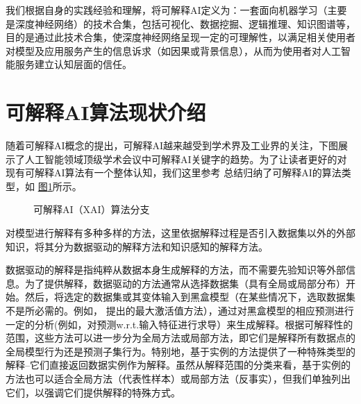 \documentclass[letterpaper,10pt,english]{sphinxmanual}
\let\sphinxpxdimen\pdfpxdimen\else\newdimen\sphinxpxdimen
\begin{document}
\sphinxAtStartPar
我们根据自身的实践经验和理解，将可解释AI定义为：一套面向机器学习（主要是深度神经网络）的技术合集，包括可视化、数据挖掘、逻辑推理、知识图谱等，目的是通过此技术合集，使深度神经网络呈现一定的可理解性，以满足相关使用者对模型及应用服务产生的信息诉求（如因果或背景信息），从而为使用者对人工智能服务建立认知层面的信任。


\section{可解释AI算法现状介绍}
\label{\detokenize{chapter_explainable_AI/explainable_ai:id2}}
\sphinxAtStartPar
随着可解释AI概念的提出，可解释AI越来越受到学术界及工业界的关注，下图展示了人工智能领域顶级学术会议中可解释AI关键字的趋势。为了让读者更好的对现有可解释AI算法有一个整体认知，我们这里参考
总结归纳了可解释AI的算法类型，如
\hyperref[\detokenize{chapter_explainable_AI/explainable_ai:xai-methods}]{图\ref{\detokenize{chapter_explainable_AI/explainable_ai:xai-methods}}}所示。

\begin{figure}[H]
\centering
\capstart

\noindent\sphinxincludegraphics[width=800\sphinxpxdimen]{{XAI_methods}.PNG}
\caption{可解释AI（XAI）算法分支}\label{\detokenize{chapter_explainable_AI/explainable_ai:id24}}\label{\detokenize{chapter_explainable_AI/explainable_ai:xai-methods}}\end{figure}

\sphinxAtStartPar
对模型进行解释有多种多样的方法，这里依据解释过程是否引入数据集以外的外部知识，将其分为数据驱动的解释方法和知识感知的解释方法。

\sphinxAtStartPar
{}

\sphinxAtStartPar
数据驱动的解释是指纯粹从数据本身生成解释的方法，而不需要先验知识等外部信息。为了提供解释，数据驱动的方法通常从选择数据集（具有全局或局部分布）开始。然后，将选定的数据集或其变体输入到黑盒模型（在某些情况下，选取数据集不是所必需的。例如，
提出的最大激活值方法），通过对黑盒模型的相应预测进行一定的分析(例如，对预测w.r.t.输入特征进行求导）来生成解释。根据可解释性的范围，这些方法可以进一步分为全局方法或局部方法，即它们是解释所有数据点的全局模型行为还是预测子集行为。特别地，基于实例的方法提供了一种特殊类型的解释–它们直接返回数据实例作为解释。虽然从解释范围的分类来看，基于实例的方法也可以适合全局方法（代表性样本）或局部方法（反事实），但我们单独列出它们，以强调它们提供解释的特殊方式。
\end{document}
